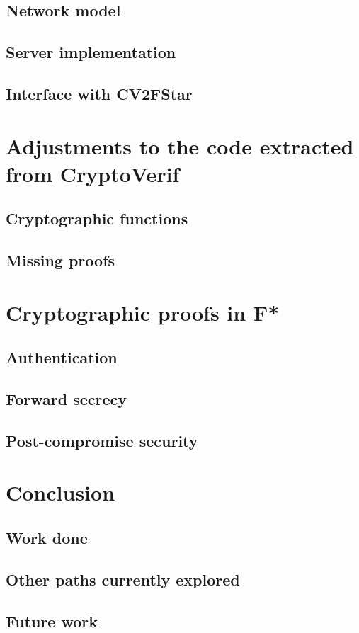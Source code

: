 \documentclass[a4paper, 10pt]{article}
\newcommand{\cv}{CryptoVerif}
\begin{document}
	\subsection{Network model}

	\subsection{Server implementation}

	\subsection{Interface with CV2FStar}

\section{Adjustments to the code extracted from \cv}
	\subsection{Cryptographic functions}

	\subsection{Missing proofs}

\section{Cryptographic proofs in F*}
	\subsection{Authentication}

	\subsection{Forward secrecy}

	\subsection{Post-compromise security}

\section{Conclusion}
	\subsection{Work done}

	\subsection{Other paths currently explored}

	\subsection{Future work}
\end{document}
